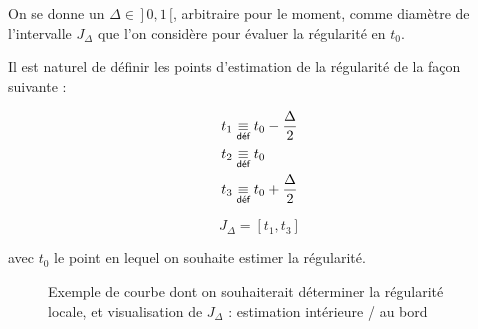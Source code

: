 \smallskip

On se donne un $\Delta \in \, ] \, 0,1 \,[$, arbitraire pour le moment, comme diamètre de l'intervalle $J_\Delta$ que l'on considère pour évaluer la régularité en $t_0$.

\noindent Il est naturel de définir les points d'estimation de la régularité de la façon suivante :

\begin{minipage}{0.5\textwidth}
	\begin{align*}
		t_1 & \isdef t_0 - \frac \Delta 2 \\
		t_2 & \isdef t_0                  \\
		t_3 & \isdef t_0 + \frac \Delta 2
	\end{align*}
\end{minipage}
\hfill
\begin{minipage}{0.5\textwidth}
	\begin{equation*}
		J_\Delta = [t_1, t_3]
	\end{equation*}

	\begin{center}
		avec $t_0$ le point en lequel on souhaite estimer la régularité.
	\end{center}
\end{minipage}


\begin{figure}[H]
	\centering
	\begin{minipage}{0.45\linewidth}
		\scalebox{0.885}{
			
		}
	\end{minipage}
	\hfill
	\begin{minipage}{0.45\linewidth}
		\scalebox{0.885}{
			
		}
	\end{minipage}
	\label{fig:delta_method_example}
	\caption{Exemple de courbe dont on souhaiterait déterminer la régularité locale, et visualisation de $J_\Delta$ : estimation intérieure / au bord}
\end{figure}

